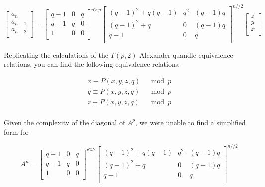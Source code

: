 \documentclass[paper.tex]{subfiles}
\begin{document}
\[ 
\left[ \begin{array}{ccc}
a_{n} \\
a_{n-1} \\
a_{n-2} \\
\end{array} \right] 
=
\left[ \begin{array}{ccc}
q-1 & 0 & q \\
q-1 & q & 0 \\
1 & 0 & 0 \\
\end{array} \right] ^{n\%p}
\left[ \begin{array}{ccc}
(q-1)^{2} + q(q-1) & q^{2} & (q-1)q \\
(q-1)^{2} + q & 0 & (q-1)q \\
q-1 & 0 & q \\
\end{array} \right] ^{n//2} 
\left[ \begin{array}{ccc}
z \\
y \\
x \\
\end{array} \right] 
\] 

Replicating the calculations of the $T(p,2)$ Alexander quandle equivalence relations, you can find the following equivalence relations:

\begin{align*}
	x \equiv P(x,y,z,q) & \mod{p} \\
	y \equiv P(x,y,z,q) & \mod{p} \\
	z \equiv P(x,y,z,q) & \mod{p} \\
\end{align*}

Given the complexity of the diagonal of $A^{p}$, we were unable to find a simplified form for 

\[ A^{n}
=
\left[ \begin{array}{ccc}
q-1 & 0 & q \\
q-1 & q & 0 \\
1 & 0 & 0 \\
\end{array} \right] ^{n\%2}
\left[ \begin{array}{ccc}
(q-1)^{2} + q(q-1) & q^{2} & (q-1)q \\
(q-1)^{2} + q & 0 & (q-1)q \\
q-1 & 0 & q \\
\end{array} \right] ^{n//2} 
\]
\end{document}
